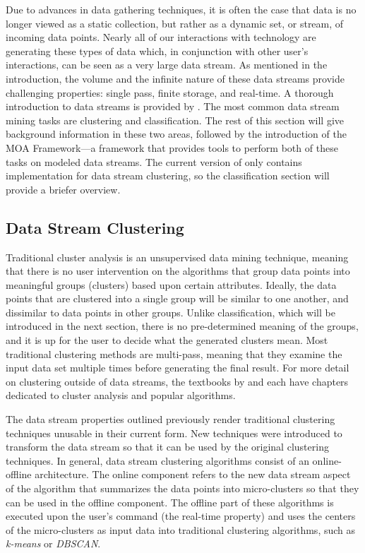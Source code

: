 \documentclass[nojss]{jss}
\begin{document}
Due to advances in data gathering techniques, it is often the case that data is no longer viewed as a static collection, but rather as a dynamic set, or stream, of incoming data points. Nearly all of our interactions with technology are generating these types of data which, in conjunction with other user's interactions, can be seen as a very large data stream. As mentioned in the introduction, the volume and the infinite nature of these data streams provide challenging properties: single pass, finite storage, and real-time. A thorough introduction to data streams is provided by \cite{stream:Aggarwal:2007} . The most common data stream mining tasks are clustering and classification. The rest of this section will give background information in these two areas, followed by the introduction of the MOA Framework---a framework that provides tools to perform both of these tasks on modeled data streams. The current version of  only contains implementation for data stream clustering, so the classification section will provide a briefer overview.

\subsection{Data Stream Clustering}
\label{sec:background:dsc}

Traditional cluster analysis is an unsupervised data mining technique, meaning that there is no user intervention on the algorithms that group data points into meaningful groups (clusters) based upon certain attributes. Ideally, the data points that are clustered into a single group will be similar to one another, and dissimilar to data points in other groups. Unlike classification, which will be introduced in the next section, there is no pre-determined meaning of the groups, and it is up for the user to decide what the generated clusters mean. Most traditional clustering methods are multi-pass, meaning that they examine the input data set multiple times before generating the final result. For more detail on clustering outside of data streams, the textbooks by \cite{stream:Dunham:2002} and \cite{stream:Tan+Steinbach+Kumar:2006} each have chapters dedicated to cluster analysis and popular algorithms.


The data stream properties outlined previously render traditional clustering techniques unusable in their current form. New techniques were introduced to transform the data stream so that it can be used by the original clustering techniques. In general, data stream clustering algorithms consist of an online-offline architecture. The online component refers to the new data stream aspect of the algorithm that summarizes the data points into micro-clusters so that they can be used in the offline component. The offline part of these algorithms is executed upon the user's command (the real-time property) and uses the centers of the micro-clusters as input data into traditional clustering algorithms, such as \textit{k-means} or \textit{DBSCAN}. 
\end{document}
